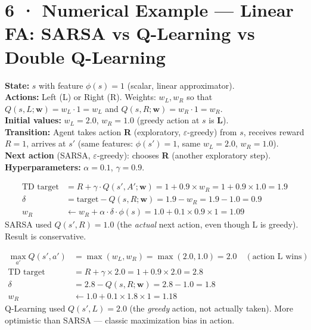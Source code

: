 \documentclass[11pt,a4paper]{article}
\begin{document}
\section*{6 · Numerical Example — Linear FA: SARSA vs Q-Learning vs Double Q-Learning}

\begin{tcolorbox}[exam={Setup}]
\textbf{State:} $s$ with feature $\phi(s) = 1$ (scalar, linear approximator).\\
\textbf{Actions:} Left (L) or Right (R). Weights: $w_L, w_R$ so that
$Q(s, L;\mathbf{w}) = w_L \cdot 1 = w_L$ and $Q(s, R;\mathbf{w}) = w_R \cdot 1 = w_R$.\\
\textbf{Initial values:} $w_L = 2.0$, $w_R = 1.0$ (greedy action at $s$ is \textbf{L}).\\
\textbf{Transition:} Agent takes action \textbf{R} (exploratory, $\varepsilon$-greedy) from $s$,
receives reward $R = 1$, arrives at $s'$ (same features: $\phi(s') = 1$, same $w_L=2.0$, $w_R=1.0$).\\
\textbf{Next action} (SARSA, $\varepsilon$-greedy): chooses \textbf{R} (another exploratory step).\\
\textbf{Hyperparameters:} $\alpha = 0.1$, $\gamma = 0.9$.
\end{tcolorbox}

\begin{tcolorbox}[exam={Method 1 — SARSA: on-policy / actual next action}]
\begin{align*}
  \text{TD target} &= R + \gamma \cdot Q(s', A'; \mathbf{w}) = 1 + 0.9 \times w_R = 1 + 0.9 \times 1.0 = 1.9 \\
  \delta &= \text{target} - Q(s, R;\mathbf{w}) = 1.9 - w_R = 1.9 - 1.0 = 0.9 \\
  w_R &\leftarrow w_R + \alpha \cdot \delta \cdot \phi(s) = 1.0 + 0.1 \times 0.9 \times 1 = \mathbf{1.09}
\end{align*}
SARSA used $Q(s', R) = 1.0$ (the \emph{actual} next action, even though L is greedy).
Result is conservative.
\end{tcolorbox}

\begin{tcolorbox}[exam={Method 2 — Q-Learning: off-policy / greedy max action}]
\begin{align*}
  \max_{a'} Q(s', a') &= \max(w_L, w_R) = \max(2.0, 1.0) = 2.0 \quad (\text{action L wins}) \\
  \text{TD target} &= R + \gamma \times 2.0 = 1 + 0.9 \times 2.0 = 2.8 \\
  \delta &= 2.8 - Q(s, R;\mathbf{w}) = 2.8 - 1.0 = 1.8 \\
  w_R &\leftarrow 1.0 + 0.1 \times 1.8 \times 1 = \mathbf{1.18}
\end{align*}
Q-Learning used $Q(s', L) = 2.0$ (the \emph{greedy} action, not actually taken).
More optimistic than SARSA — classic maximization bias in action.
\end{tcolorbox}
\end{document}
